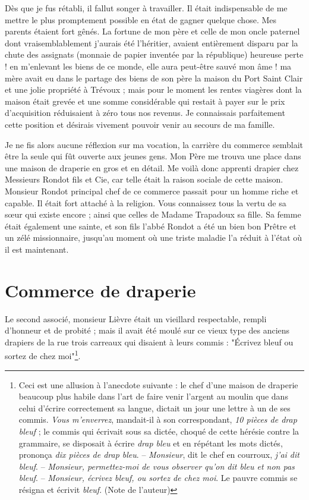 \documentclass[11pt,a4paper]{report}
\begin{document}
Dès que je fus rétabli, il fallut songer à travailler. Il était indispensable de me mettre le plus promptement possible en état de gagner quelque chose. Mes parents étaient fort gênés. La fortune de mon père et celle de mon oncle paternel dont vraisemblablement j'aurais été l'héritier, avaient entièrement disparu par la chute des assignats (monnaie de papier inventée par la république) heureuse perte ! en m'enlevant les biens de ce monde, elle aura peut-être sauvé mon âme ! ma mère avait eu dans le partage des biens de son père la maison du Port Saint Clair et une jolie propriété à Trévoux ; mais pour le moment les rentes viagères dont la maison était grevée et une somme considérable qui restait à payer sur le prix d'acquisition réduisaient à zéro tous nos revenus. Je connaissais parfaitement cette position et désirais vivement pouvoir venir au secours de ma famille.

Je ne fis alors aucune réflexion sur ma vocation, la carrière du commerce semblait être la seule qui fût ouverte aux jeunes gens. Mon Père me trouva une place dans une maison de draperie en gros et en détail. Me voilà donc apprenti drapier chez Messieurs Rondot fils et Cie, car telle était la raison sociale de cette maison. Monsieur Rondot principal chef de ce commerce passait pour un homme riche et capable. Il était fort attaché à la religion. Vous connaissez tous la vertu de sa sœur qui existe encore ; ainsi que celles de Madame Trapadoux sa fille. Sa femme était également une sainte, et son fils l'abbé Rondot a été un bien bon Prêtre et un zélé missionnaire, jusqu'au moment où une triste maladie l'a réduit à l'état où il est maintenant.

\section*{Commerce de draperie}

Le second associé, monsieur Lièvre était un vieillard respectable, rempli d'honneur et de probité ; mais il avait été moulé sur ce vieux type des anciens drapiers de la rue trois carreaux qui disaient à leurs commis : "Écrivez bleuf ou sortez de chez moi"\footnote{Ceci est une allusion à l'anecdote suivante : le chef d'une maison de draperie beaucoup plus habile dans l'art de faire venir l'argent au moulin que dans celui d'écrire correctement sa langue, dictait un jour une lettre à un de ses commis. \textit{Vous m'enverrez}, mandait-il à son correspondant, \textit{10 pièces de drap bleuf} ; le commis qui écrivait sous sa dictée, choqué de cette hérésie contre la grammaire, se disposait à écrire \textit{drap bleu} et en répétant les mots dictés, prononça \textit{dix pièces de drap bleu}. -- \textit{Monsieur}, dit le chef en courroux, \textit{j'ai dit bleuf}. -- \textit{Monsieur, permettez-moi de vous observer qu'on dit bleu et non pas bleuf}. -- \textit{Monsieur, écrivez bleuf, ou sortez de chez moi}. Le pauvre commis se résigna et écrivit \textit{bleuf}. (Note de l'auteur)}.
\end{document}
